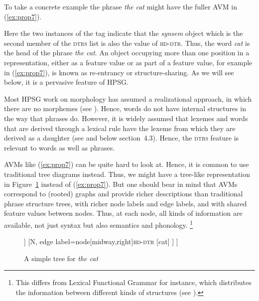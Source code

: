 \documentclass[output=paper
	        ,collection
	        ,collectionchapter
 	        ,biblatex
                ,babelshorthands
                ,newtxmath
                ,draftmode
                ,colorlinks, citecolor=brown
]{langscibook}
\begin{document}
To take a concrete example the phrase \emph{the cat} might have the fuller AVM in (\ref{ex:prop7}).

\ea\label{ex:prop7}
\z

Here the two instances of the tag \avmtmp{\1} indicate that the \emph{synsem} object which is the second member of the \textsc{dtrs} list is also the value of \textsc{hd-dtr}. Thus, the word \emph{cat} is the head of the phrase \emph{the cat}. An object occupying more than one position in a representation, either as a feature value or as part of a feature value, for example \avmtmp{\1} in (\ref{ex:prop7}), is known as re-entrancy or structure-sharing. As we will see below, it is a pervasive feature of HPSG.

Most HPSG work on morphology has assumed a realizational approach, in which there are no morphemes (see ). Hence, words do not have internal structures in the way that phrases do. However, it is widely assumed that lexemes and words that are derived through a lexical rule have the lexeme from which they are derived as a daughter (see  and below section~4.3). Hence, the \textsc{dtrs} feature is relevant to words as well as phrases.

AVMs like (\ref{ex:prop7}) can be quite hard to look at. Hence, it is common to use traditional tree diagrams instead. Thus, we might have a tree-like representation in Figure~\ref{fig:prop2} instead of (\ref{ex:prop7}). But one should bear in mind that AVMs correspond to (rooted) graphs and provide richer descriptions than traditional phrase structure trees, with richer node labels and edge labels, and with shared feature values between nodes. Thus, at each node, all kinds of information are available, not just syntax but also semantics and phonology.%
%
\footnote{This differs from Lexical Functional Grammar for instance, which distributes the information between different kinds of structures (see ).}
%

\begin{figure}[h!]
\begin{forest}
[NP
	[Det
		[the]
	]
	[N, edge label={node[midway,right]{\textsc{hd-dtr}}}
		[cat]
	]
]
\end{forest}
	
\caption{A simple tree for \emph{the cat}}\label{fig:prop2}
\end{figure}
\end{document}

